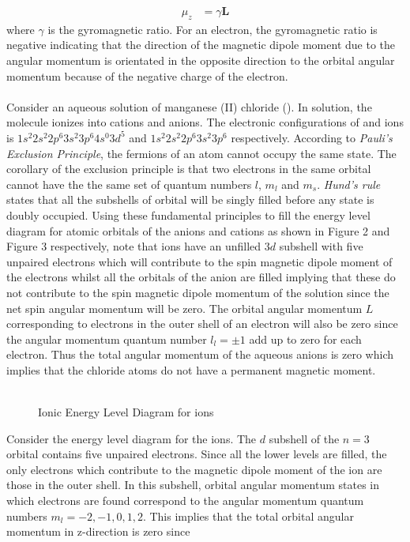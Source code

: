 \documentclass[a4paper,11pt]{article}
\begin{document}
\begin{align}
\mu_z	& = \gamma \mathbf{L}
\end{align}
where $\gamma$ is the gyromagnetic ratio. For an electron, the gyromagnetic ratio is negative indicating that the direction of the magnetic dipole moment due to the angular momentum is orientated in the opposite direction to the orbital angular momentum because of the negative charge of the electron.\\
\\
Consider an aqueous solution of manganese (II) chloride (). In solution, the molecule ionizes into  cations and  anions. The electronic configurations of  and  ions is $1s^{2}2s^{2}2p^{6}3s^{2}3p^{6}4s^{0}3d^{5}$ and $1s^{2}2s^{2}2p^{6}3s^{2}3p^{6}$ respectively. According to \textit{Pauli's Exclusion Principle}, the fermions of an atom cannot occupy the same state. The corollary of the exclusion principle is that two electrons in the same orbital cannot have the the same set of quantum numbers $l$, $m_l$ and $m_s$. \textit{Hund's rule} states that all the subshells of orbital will be singly filled before any state is doubly occupied. Using these fundamental principles to fill the energy level diagram for atomic orbitals of the anions and cations as shown in Figure 2 and Figure 3 respectively, note that  ions have an unfilled $3d$ subshell with five unpaired electrons which will contribute to the spin magnetic dipole moment of the electrons whilst all the orbitals of the anion are filled implying that these do not contribute to the spin magnetic dipole momentum of the solution since the net spin angular momentum will be zero. The orbital angular momentum $L$ corresponding to electrons in the outer shell of an electron will also be zero since the angular momentum quantum number $l_l = \pm 1$ add up to zero for each electron. Thus the total angular momentum of the aqueous anions is zero which implies that the chloride atoms do not have a permanent magnetic moment.\\
\\

\begin{figure}[ht!]
{}
\caption{Ionic Energy Level Diagram for  ions}
\label{Fig:2}
\end{figure}

Consider the energy level diagram for the  ions. The $d$ subshell of the $n=3$ orbital contains five unpaired electrons. Since all the lower levels are filled, the only electrons which contribute to the magnetic dipole moment of the ion are those in the outer shell. In this subshell, orbital angular momentum states in which electrons are found correspond to the angular momentum quantum numbers $m_l = -2, -1, 0, 1, 2$. This implies that the total orbital angular momentum in z-direction is zero since 
\end{document}
